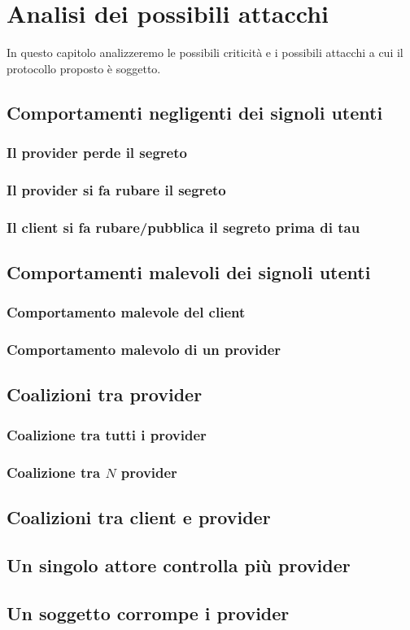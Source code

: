 \chapter{Analisi dei possibili attacchi}
\label{chap:analisi-attacchi}

In questo capitolo analizzeremo le possibili criticità e i
possibili attacchi a cui il protocollo proposto
è soggetto.

\section{Comportamenti negligenti dei signoli utenti}
\subsection{Il provider perde il segreto}
\subsection{Il provider si fa rubare il segreto}
\subsection{Il client si fa rubare/pubblica il segreto prima di tau}


\section{Comportamenti malevoli dei signoli utenti}
\subsection{Comportamento malevole del client}
\subsection{Comportamento malevolo di un provider}


\section{Coalizioni tra provider}
\subsection{Coalizione tra tutti i provider}
\subsection{Coalizione tra $ N $ provider}

\section{Coalizioni tra client e provider}

\section{Un singolo attore controlla più provider}

\section{Un soggetto corrompe i provider}
